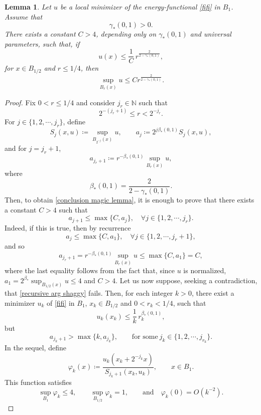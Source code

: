 \documentclass[reqno,11pt]{amsart}
\newtheorem{lemma}{Lemma}[section]
\newcommand{\1}{\mathds{1}}
\numberwithin{equation}{section}
\begin{document}
\begin{lemma}\label{april.2} 
Let $u$ be a local minimizer of the energy-functional \eqref{fifi} in $B_1$. Assume that
$$
    \gamma_\ast (0,1)>0.
$$
There exists a constant $C>4$, depending only on $\gamma_\ast (0,1)$ and universal parameters, such that, if 
$$
    u(x) \le \frac{1}{C} \, r^{\frac{2}{2-\gamma_\ast(0,1)}}, 
$$
for $x\in B_{1/2}$ and $r \leq 1/4$, then
\begin{equation}\label{conclusion magic lemma}
    \sup_{B_r(x)} u \leq C r^{\frac{2}{2-\gamma_\ast(0,1)}}.
\end{equation}   
\end{lemma}

\begin{proof}
Fix $0<r \leq 1/4$ and consider $j_r \in \mathbb{N}$ such that
$$
    2^{-(j_r+1)} \leq r < 2^{-j_r}.
$$
For $j \in \{1, 2, \cdots, j_r \}$, define
\[
S_j(x,u) \coloneqq \sup_{B_{2^{-j}}(x)} u,
\qquad
a_j \coloneqq 2^{j \beta_\ast(0,1)} S_j(x,u),
\]
and for $j=j_r+1$,
\[
a_{j_r+1} \coloneqq r^{-\beta_\ast(0,1)} \sup_{B_r(x)} u,
\]
where
$$
    \beta_\ast(0,1) = \frac{2}{2-\gamma_\ast (0,1)}.
$$
Then, to obtain \eqref{conclusion magic lemma}, it is enough to prove that there exists a constant $C>4$ such that
\begin{equation}\label{recursive arg shaggy}
    a_{j+1} \leq \max\{C,a_j\}, \quad \forall j \in \{1, 2, \cdots, j_r\}.
\end{equation}
Indeed, if this is true, then by recurrence
$$
    a_j \leq \max\{C,a_1\}, \quad \forall j \in \{1, 2, \cdots, j_r+1\},
$$
and so
$$
    a_{j_r + 1} = r^{-\beta_\ast(0,1)}\sup_{B_r(x)}u \leq \max\{C,a_1\} = C,
$$
where the last equality follows from the fact that, since $u$ is normalized, $a_1 = 2^{\beta_\ast} \sup_{B_{1/2}(x)}u \leq 4$ and $C>4$. Let us now suppose, seeking a contradiction, that \eqref{recursive arg shaggy} fails. Then, for each integer $k>0$, there exist a minimizer $u_k$ of \eqref{fifi} in $B_1$, $x_k \in B_{1/2}$ and $ 0< r_k < 1/4$, such that 
$$
    u_k(x_k) \le \frac{1}{k} \, r_k^{\beta_\ast(0,1)},
$$
but
\begin{equation}\label{equiv inequality}
    a_{j_k + 1} > \max\{k,a_{j_k}\}, \qquad \text{for some} \ j_k \in \{1,2,\cdots, j_{r_k}\}.
\end{equation}
In the sequel, define
\[
\varphi_k(x) \coloneqq 
   \frac{u_k(x_k+2^{-j_k}x)}{S_{j_k+1}(x_k,u_k)},
   \qquad x\in B_1.
\]
This function satisfies
\begin{equation}\label{this better work}
    \sup_{B_1} \varphi_k \leq 4, \qquad \sup_{B_{1/2}} \varphi_k = 1, \qquad \text{and} \quad \varphi_k(0) = O(k^{-2}).

\end{equation}
\end{proof}
\end{document}
